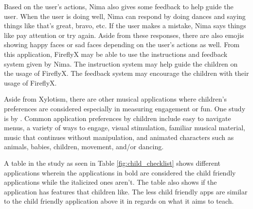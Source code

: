 Based on the user's actions, Nima also gives some feedback to help guide the user. When the user is doing well, Nima can respond by doing dances and saying things like that's great, bravo, etc. If the user makes a mistake, Nima says things like pay attention or try again. Aside from these responses, there are also emojis showing happy faces or sad faces depending on the user's actions as well. From this application, FireflyX may be able to use the instructions and feedback system given by Nima. The instruction system may help guide the children on the usage of FireflyX. The feedback system may encourage the children with their usage of FireflyX.



Aside from Xylotism, there are other musical applications where children’s preferences are considered especially in measuring engagement or fun. One study is by . Common application preferences by children include easy to navigate menus, a variety of ways to engage, visual stimulation, familiar musical material, music that continues without manipulation, and animated characters such as animals, babies, children, movement, and/or dancing.

A table in the study as seen in Table \ref{fig:child_checklist} shows different applications wherein the applications in bold are considered the child friendly applications while the italicized ones aren’t. The table also shows if the application has features that children like. The less child friendly apps are similar to the child friendly application above it in regards on what it aims to teach. 


